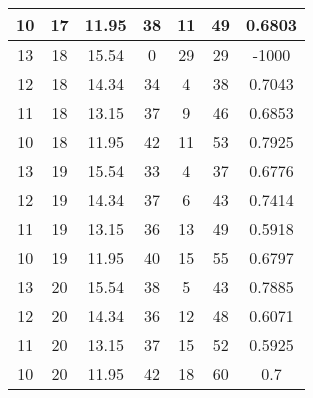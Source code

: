 \documentclass[letterpaper, 12pt]{article}
\begin{document}
\begin{longtable}{|c|c|c|c|c|c|c|}
10 & 17 & 11.95 & 38 & 11 & 49 & 0.6803 \\
\hline
13 & 18 & 15.54 & 0 & 29 & 29 & -1000 \\
\hline
12 & 18 & 14.34 & 34 & 4 & 38 & 0.7043 \\
\hline
11 & 18 & 13.15 & 37 & 9 & 46 & 0.6853 \\
\hline
10 & 18 & 11.95 & 42 & 11 & 53 & 0.7925 \\
\hline
13 & 19 & 15.54 & 33 & 4 & 37 & 0.6776 \\
\hline
12 & 19 & 14.34 & 37 & 6 & 43 & 0.7414 \\
\hline
11 & 19 & 13.15 & 36 & 13 & 49 & 0.5918 \\
\hline
10 & 19 & 11.95 & 40 & 15 & 55 & 0.6797 \\
\hline
13 & 20 & 15.54 & 38 & 5 & 43 & 0.7885 \\
\hline
12 & 20 & 14.34 & 36 & 12 & 48 & 0.6071 \\
\hline
11 & 20 & 13.15 & 37 & 15 & 52 & 0.5925 \\
\hline
10 & 20 & 11.95 & 42 & 18 & 60 & 0.7 \\
\hline
\end{longtable}
\end{document}
